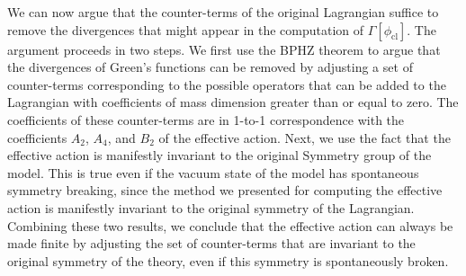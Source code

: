 \documentclass[cyan]{elegantnote}
\begin{document}
We can now argue that the counter-terms of the original Lagrangian suffice to remove the divergences that might appear in the computation of $\Gamma[\phi_{\mathrm{cl}}]$. The argument proceeds in two steps. We first use the BPHZ theorem to argue that the divergences of Green's functions can be removed by adjusting a set of counter-terms corresponding to the possible operators that can be added to the Lagrangian with coefficients of mass dimension greater than or equal to zero. The coefficients of these counter-terms are in 1-to-1 correspondence with the coefficients $A_2$, $A_4$, and $B_2$ of the effective action. Next, we use the fact that the effective action is manifestly invariant to the original Symmetry group of the model. This is true even if the vacuum state of the model has spontaneous symmetry breaking, since the method we presented for computing the effective action is manifestly invariant to the original symmetry of the Lagrangian. Combining these two results, we conclude that the effective action can always be made finite by adjusting the set of counter-terms that are invariant to the original symmetry of the theory, even if this symmetry is spontaneously broken.
\end{document}
